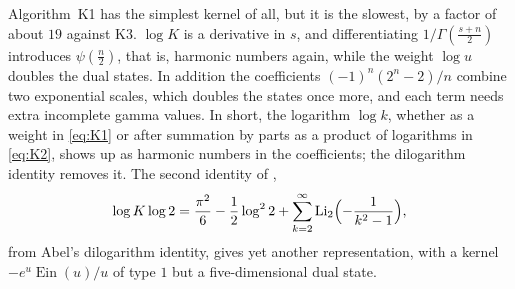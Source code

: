 \documentclass[11pt,reqno]{amsart}
\theoremstyle{definition}
\theoremstyle{remark}
\newcommand{\Ein}{\operatorname{Ein}}
\newcommand{\Li}{\operatorname{Li}}
\begin{document}
Algorithm~K1 has the simplest kernel of all, but it is the slowest, by a factor of about
$19$ against K3. $\log K$ is a
derivative in $s$, and differentiating $1/\Gamma(\frac{s+n}2)$ introduces $\psi(\frac n2)$, that is, harmonic numbers
again, while the weight $\log u$ doubles the dual states. In addition the coefficients
$(-1)^n(2^n-2)/n$ combine two exponential scales, which doubles the states once more, and each term needs extra
incomplete gamma values. In short, the logarithm $\log k$, whether as a weight in \eqref{eq:K1} or after summation by parts
as a product of logarithms in \eqref{eq:K2}, shows up as harmonic numbers in the coefficients; the dilogarithm
identity removes it. The second identity of
\cite[\S3]{BBC97},
\[
  \log K\log2 = \frac{\pi^2}{6} - \frac12\log^22 + \sum_{k=2}^{\infty}\Li_2\Bigl(-\frac1{k^2-1}\Bigr),
\]
from Abel's dilogarithm identity, gives yet another representation, with a kernel $-e^u\Ein(u)/u$ of type $1$ but a
five-dimensional dual state.
\end{document}
